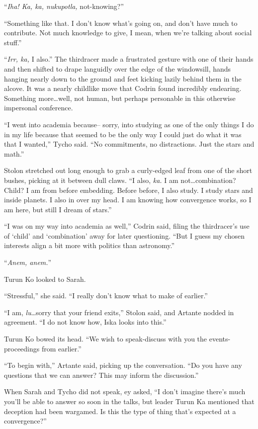 ``\emph{Iha! Ka, ka, nukupotla,} not-knowing?''

``Something like that. I don't know what's going on, and don't have much to contribute. Not much knowledge to give, I mean, when we're talking about social stuff.''

``\emph{Irr, ka,} I also.'' The thirdracer made a frustrated gesture with one of their hands and then shifted to drape languidly over the edge of the windowsill, hands hanging nearly down to the ground and feet kicking lazily behind them in the alcove. It was a nearly childlike move that Codrin found incredibly endearing. Something more\ldots well, not human, but perhaps personable in this otherwise impersonal conference.

``I went into academia because-- sorry, into studying as one of the only things I do in my life because that seemed to be the only way I could just do what it was that I wanted,'' Tycho said. ``No commitments, no distractions. Just the stars and math.''

Stolon stretched out long enough to grab a curly-edged leaf from one of the short bushes, picking at it between dull claws. ``I also, \emph{ka.} I am not\ldots combination? Child? I am from before embedding. Before before, I also study. I study stars and inside planets. I also in over my head. I am knowing how convergence works, so I am here, but still I dream of stars.''

``I was on my way into academia as well,'' Codrin said, filing the thirdracer's use of `child' and `combination' away for later questioning. ``But I guess my chosen interests align a bit more with politics than astronomy.''

``\emph{Anem, anem.}''

Turun Ko looked to Sarah.

``Stressful,'' she said. ``I really don't know what to make of earlier.''

``I am, \emph{lu}\ldots sorry that your friend exits,'' Stolon said, and Artante nodded in agreement. ``I do not know how, Iska looks into this.''

Turun Ko bowed its head. ``We wish to speak-discuss with you the events-proceedings from earlier.''

``To begin with,'' Artante said, picking up the conversation. ``Do you have any questions that we can answer? This may inform the discussion.''

When Sarah and Tycho did not speak, ey asked, ``I don't imagine there's much you'll be able to answer so soon in the talks, but leader Turun Ka mentioned that deception had been wargamed. Is this the type of thing that's expected at a convergence?''

